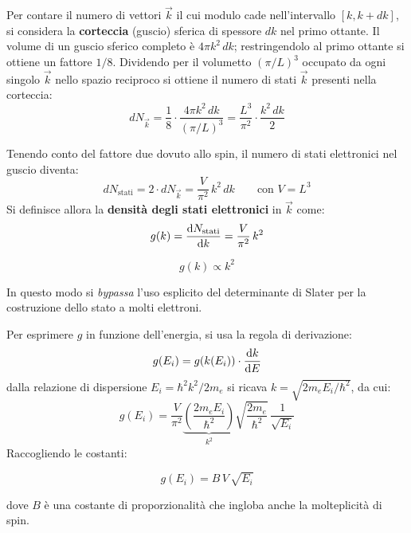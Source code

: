 Per contare il numero di vettori \(\vec{k}\) il cui modulo cade nell'intervallo \([k, k + dk]\), si considera la \textbf{corteccia} (guscio) sferica di spessore \(dk\) nel primo ottante. Il volume di un guscio sferico completo è \(4\pi k^2\, dk\); restringendolo al primo ottante si ottiene un fattore \(1/8\). Dividendo per il volumetto \((\pi/L)^3\) occupato da ogni singolo \(\vec{k}\) nello spazio reciproco si ottiene il numero di stati \(\vec{k}\) presenti nella corteccia:
\begin{equation}
    dN_{\vec{k}} = \frac{1}{8} \cdot \frac{4\pi k^2\, dk}{(\pi/L)^3} = \frac{L^3}{\pi^2} \cdot \frac{k^2\, dk}{2}
\end{equation}

Tenendo conto del fattore due dovuto allo spin, il numero di stati elettronici nel guscio diventa:
\begin{equation}
    dN_{\text{stati}} = 2 \cdot dN_{\vec{k}} = \frac{V}{\pi^2}\, k^2\, dk \qquad \text{con } V = L^3
\end{equation}
Si definisce allora la \textbf{densità degli stati elettronici} in \(\vec{k}\) come:
\begin{equation}
    g(k) = \dv{N_{\text{stati}}}{k} = \frac{V}{\pi^2}\, k^2
\end{equation}
\begin{tcolorbox}[colback=blue!5, colframe=blue!50, sharp corners, boxrule=0.5pt]
    \begin{equation}
        g(k) \propto k^2
    \end{equation}
\end{tcolorbox}
In questo modo si \emph{bypassa} l'uso esplicito del determinante di Slater per la costruzione dello stato a molti elettroni.

Per esprimere \(g\) in funzione dell'energia, si usa la regola di derivazione:
\begin{equation}
    g(E_i) = g(k(E_i)) \cdot \dv{k}{E}
\end{equation}
dalla relazione di dispersione \(E_i = \hbar^2 k^2 / 2m_e\) si ricava \(k = \sqrt{2 m_e E_i / \hbar^2}\), da cui:
\begin{equation}
    g(E_i) = \frac{V}{\pi^2} \underbrace{\left(\frac{2 m_e E_i}{\hbar^2}\right)}_{k^2} \sqrt{\frac{2 m_e}{\hbar^2}}\, \frac{1}{\sqrt{E_i}}
\end{equation}
Raccogliendo le costanti:
\begin{importantbox}
    \begin{equation}
        g(E_i) = B\, V\, \sqrt{E_i}
    \end{equation}
\end{importantbox}
dove \(B\) è una costante di proporzionalità che ingloba anche la molteplicità di spin.

